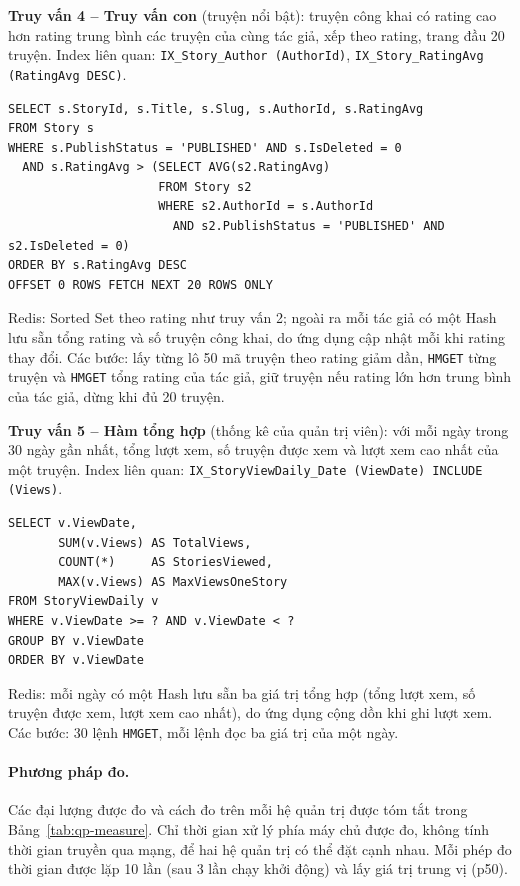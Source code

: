 \textbf{Truy vấn 4 -- Truy vấn con} (truyện nổi bật): truyện công khai có rating cao hơn rating trung bình các truyện của cùng tác giả, xếp theo rating, trang đầu 20 truyện. Index liên quan: \texttt{IX\_Story\_Author (AuthorId)}, \texttt{IX\_Story\_RatingAvg (RatingAvg DESC)}.
\begin{verbatim}
SELECT s.StoryId, s.Title, s.Slug, s.AuthorId, s.RatingAvg
FROM Story s
WHERE s.PublishStatus = 'PUBLISHED' AND s.IsDeleted = 0
  AND s.RatingAvg > (SELECT AVG(s2.RatingAvg)
                     FROM Story s2
                     WHERE s2.AuthorId = s.AuthorId
                       AND s2.PublishStatus = 'PUBLISHED' AND s2.IsDeleted = 0)
ORDER BY s.RatingAvg DESC
OFFSET 0 ROWS FETCH NEXT 20 ROWS ONLY
\end{verbatim}
Redis: Sorted Set theo rating như truy vấn 2; ngoài ra mỗi tác giả có một Hash lưu sẵn tổng rating và số truyện công khai, do ứng dụng cập nhật mỗi khi rating thay đổi. Các bước: lấy từng lô 50 mã truyện theo rating giảm dần, \texttt{HMGET} từng truyện và \texttt{HMGET} tổng rating của tác giả, giữ truyện nếu rating lớn hơn trung bình của tác giả, dừng khi đủ 20 truyện.

\textbf{Truy vấn 5 -- Hàm tổng hợp} (thống kê của quản trị viên): với mỗi ngày trong 30 ngày gần nhất, tổng lượt xem, số truyện được xem và lượt xem cao nhất của một truyện. Index liên quan: \texttt{IX\_StoryViewDaily\_Date (ViewDate) INCLUDE (Views)}.
\begin{verbatim}
SELECT v.ViewDate,
       SUM(v.Views) AS TotalViews,
       COUNT(*)     AS StoriesViewed,
       MAX(v.Views) AS MaxViewsOneStory
FROM StoryViewDaily v
WHERE v.ViewDate >= ? AND v.ViewDate < ?
GROUP BY v.ViewDate
ORDER BY v.ViewDate
\end{verbatim}
Redis: mỗi ngày có một Hash lưu sẵn ba giá trị tổng hợp (tổng lượt xem, số truyện được xem, lượt xem cao nhất), do ứng dụng cộng dồn khi ghi lượt xem. Các bước: 30 lệnh \texttt{HMGET}, mỗi lệnh đọc ba giá trị của một ngày.

\paragraph{Phương pháp đo.}
Các đại lượng được đo và cách đo trên mỗi hệ quản trị được tóm tắt trong Bảng~\ref{tab:qp-measure}. Chỉ thời gian xử lý phía máy chủ được đo, không tính thời gian truyền qua mạng, để hai hệ quản trị có thể đặt cạnh nhau. Mỗi phép đo thời gian được lặp 10 lần (sau 3 lần chạy khởi động) và lấy giá trị trung vị (p50).

